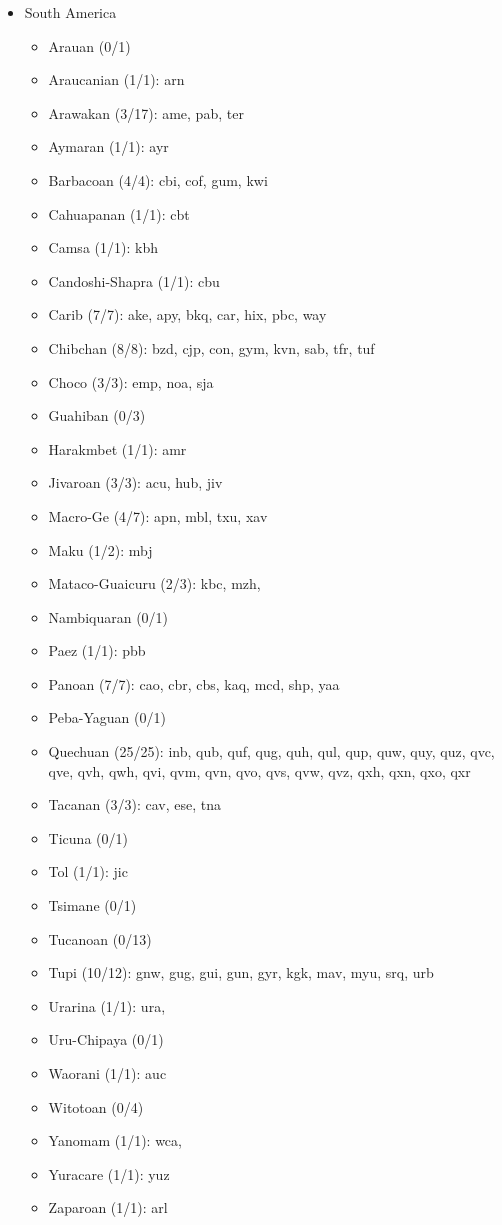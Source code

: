 \begin{itemize}[label={},leftmargin=!,labelindent=5pt,itemindent=-15pt]
  \item South America
    \begin{itemize}[label={},leftmargin=!,labelindent=5pt,itemindent=-15pt]
  	\item Arauan (0/1)
  	\item Araucanian (1/1): arn
  	\item Arawakan (3/17): ame, pab, ter
  	\item Aymaran (1/1): ayr
  	\item Barbacoan (4/4): cbi, cof, gum, kwi
  	\item Cahuapanan (1/1): cbt
  	\item Camsa (1/1): kbh
  	\item Candoshi-Shapra (1/1): cbu
  	\item Carib (7/7): ake, apy, bkq, car, hix, pbc, way
  	\item Chibchan (8/8): bzd, cjp, con, gym, kvn, sab, tfr, tuf
  	\item Choco (3/3): emp, noa, sja
  	\item Guahiban (0/3)
  	\item Harakmbet (1/1): amr
  	\item Jivaroan (3/3): acu, hub, jiv
  	\item Macro-Ge (4/7): apn, mbl, txu, xav
  	\item Maku (1/2): mbj
  	\item Mataco-Guaicuru (2/3): kbc, mzh,
  	\item Nambiquaran (0/1)
  	\item Paez (1/1): pbb
  	\item Panoan (7/7): cao, cbr, cbs, kaq, mcd, shp, yaa
  	\item Peba-Yaguan (0/1)
  	\item Quechuan (25/25): inb, qub, quf, qug, quh, qul, qup, quw, quy, quz, qvc, qve, qvh, qwh, qvi, qvm, qvn, qvo, qvs, qvw, qvz, qxh, qxn, qxo, qxr
  	\item Tacanan (3/3): cav, ese, tna
  	\item Ticuna (0/1)
  	\item Tol (1/1): jic
  	\item Tsimane (0/1)
  	\item Tucanoan (0/13)
  	\item Tupi (10/12): gnw, gug, gui, gun, gyr, kgk, mav, myu, srq, urb
  	\item Urarina (1/1): ura,
  	\item Uru-Chipaya (0/1)
  	\item Waorani (1/1): auc
  	\item Witotoan (0/4)
  	\item Yanomam (1/1): wca,
  	\item Yuracare (1/1): yuz
  	\item Zaparoan (1/1): arl
    \end{itemize}

\end{itemize}
